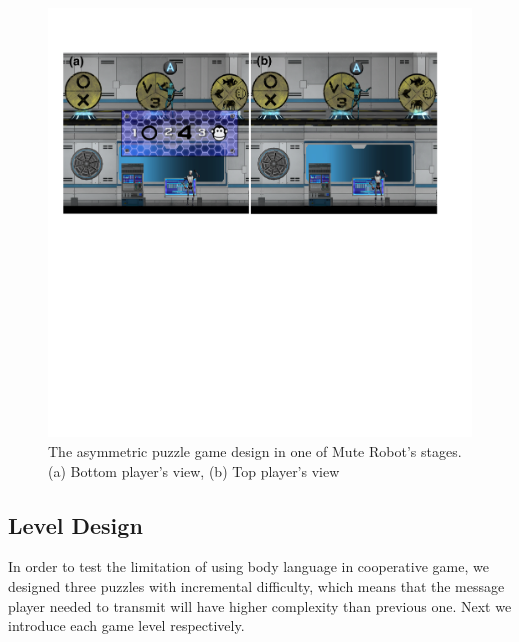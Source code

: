 \begin{figure}[!h]
\centering
\includegraphics[width=1.0\columnwidth]{Figures/GD_F2.pdf}
\caption{The asymmetric puzzle game design in one of Mute Robot's stages. (a) Bottom player's view, (b) Top player's view}
\label{fig:GD_F2}
\end{figure}


\subsection{Level Design}


In order to test the limitation of using body language in cooperative game, we designed three puzzles with incremental difficulty, which means that the message player needed to transmit will have higher complexity than previous one. Next we introduce each game level respectively.


